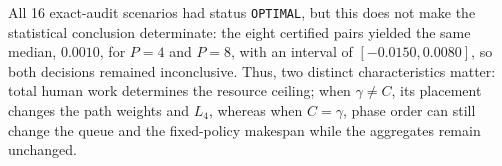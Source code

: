 All 16 exact-audit scenarios had status \texttt{OPTIMAL}, but this does not make
the statistical conclusion determinate: the eight certified pairs yielded the
same median, $0.0010$, for $P=4$ and $P=8$, with an interval of
$[-0.0150,0.0080]$, so both decisions remained inconclusive. Thus, two distinct
characteristics matter: total human work determines the resource ceiling; when
$\gamma\ne C$, its placement changes the path weights and $L_4$, whereas when
$C=\gamma$, phase order can still change the queue and the fixed-policy makespan
while the aggregates remain unchanged.
